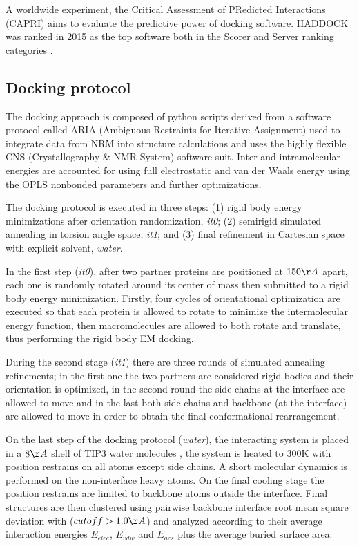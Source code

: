 \documentclass[
	12pt,				%
	openright,			%
	twoside,			%
	a4paper,			%
	english,			%
	french,				%
	spanish,			%
	brazil,				%
	]{abntex2}
\begin{document}
A worldwide experiment, the Critical Assessment of PRedicted Interactions (CAPRI) \cite{Janin2002} aims to evaluate the predictive power of docking software. HADDOCK was ranked in 2015 as the top software both in the Scorer and Server ranking categories \cite{HADDOCKCAPRI}.

\subsection{Docking protocol}

The docking approach is composed of python scripts derived from a software protocol called ARIA (Ambiguous Restraints for Iterative Assignment) \cite{Linge2001} used to integrate data from NRM into structure calculations and uses the highly flexible CNS (Crystallography \& NMR System) \cite{Brunger2013} software suit. Inter and intramolecular energies are accounted for using full electrostatic and van der Waals energy using the OPLS \cite{Jorgensen1988} nonbonded parameters and further optimizations. 

The docking protocol is executed in three steps: (1) rigid body energy minimizations after orientation randomization, \textit{it0}; (2) semirigid simulated annealing in torsion angle space, \textit{it1}; and (3) final refinement in Cartesian space with explicit solvent, \textit{water}.

In the first step (\textit{it0}), after two partner proteins are positioned at $150 \AA$ apart, each one is randomly rotated around its center of mass then submitted to a rigid body energy minimization. Firstly, four cycles of orientational optimization are executed so that each protein is allowed to rotate to minimize the intermolecular energy function, then macromolecules are allowed to both rotate and translate, thus performing the rigid body EM docking. 

During the second stage (\textit{it1}) there are three rounds of simulated annealing refinements; in the first one the two partners are considered rigid bodies and their orientation is optimized, in the second round the side chains at the interface are allowed to move and in the last both side chains and backbone (at the interface) are allowed to move in order to obtain the final conformational rearrangement.

On the last step of the docking protocol (\textit{water}), the interacting system is placed in a $8\AA$ shell of TIP3 water molecules \cite{Mark2001}, the system is heated to 300K with position restrains on all atoms except side chains. A short molecular dynamics is performed on the non-interface heavy atoms. On the final cooling stage the position restrains are limited to backbone atoms outside the interface.
Final structures are then clustered using pairwise backbone interface root mean square deviation with ($cutoff > 1.0 \AA$) and analyzed according to their average interaction energies $E_{elec}$, $E_{vdw}$ and $E_{acs}$ plus the average buried surface area. 
\end{document}
